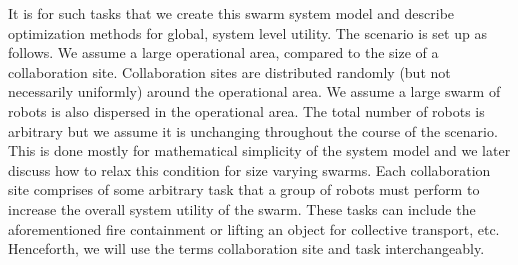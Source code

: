 \documentclass{sage}
\begin{document}
It is for such tasks that we create this swarm system model and describe optimization methods for global, system level utility. The scenario is set up as follows. We assume a large operational area, compared to the size of a collaboration site. Collaboration sites are distributed randomly (but not necessarily uniformly) around the operational area. We assume a large swarm of robots is also dispersed in the operational area. The total number of robots is arbitrary but we assume it is unchanging throughout the course of the scenario. This is done mostly for mathematical simplicity of the system model and we later discuss how to relax this condition for size varying swarms. Each collaboration site comprises of some arbitrary task that a group of robots must perform to increase the overall system utility of the swarm. These tasks can include the aforementioned fire containment or lifting an object for collective transport, etc. Henceforth, we will use the terms collaboration site and task interchangeably.
\end{document}
